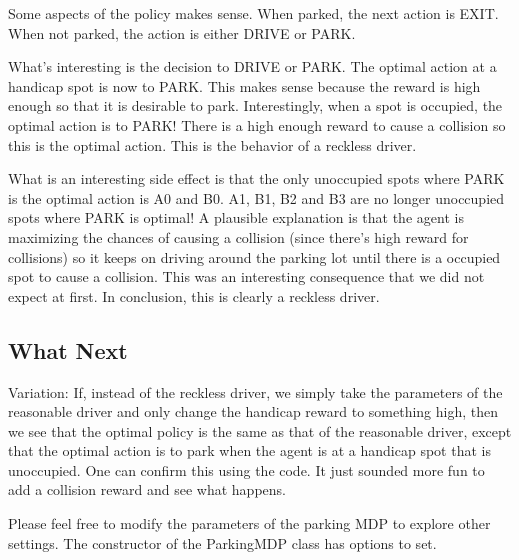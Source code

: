 \documentclass[paper=a4, fontsize=11pt]{scrartcl}
\begin{document}
Some aspects of the policy makes sense. When parked, the next action is EXIT. When not parked, the action is either DRIVE or PARK.

What's interesting is the decision to DRIVE or PARK. The optimal action at a handicap spot is now to PARK. This makes sense because the reward is high enough so that it is desirable to park. Interestingly, when a spot is occupied, the optimal action is to PARK! There is a high enough reward to cause a collision so this is the optimal action. This is the behavior of a reckless driver.

What is an interesting side effect is that the only unoccupied spots where PARK is the optimal action is A0 and B0. A1, B1, B2 and B3 are no longer unoccupied spots where PARK is optimal! A plausible explanation is that the agent is maximizing the chances of causing a collision (since there's high reward for collisions) so it keeps on driving around the parking lot until there is a occupied spot to cause a collision. This was an interesting consequence that we did not expect at first. In conclusion, this is clearly a reckless driver.

\subsection{What Next}

Variation: If, instead of the reckless driver, we simply take the parameters of the reasonable driver and only change the handicap reward to something high, then we see that the optimal policy is the same as that of the reasonable driver, except that the optimal action is to park when the agent is at a handicap spot that is unoccupied. One can confirm this using the code. It just sounded more fun to add a collision reward and see what happens.

Please feel free to modify the parameters of the parking MDP to explore other settings. The constructor of the ParkingMDP class has options to set.
\end{document}
